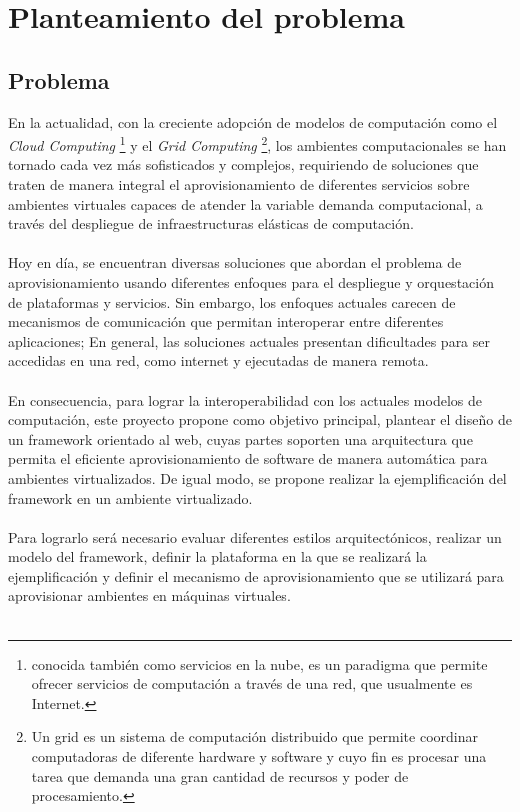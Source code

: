 \chapter{Planteamiento del problema}
\label{capproblema}

\section{Problema}
En la actualidad, con la creciente adopción de modelos de computación como el \emph{Cloud Computing} \footnote{conocida también como servicios en la nube, es un paradigma que permite ofrecer servicios de computación a través de una red, que usualmente es Internet.} y el \emph{Grid Computing} \footnote{Un grid es un sistema de computación distribuido que permite coordinar computadoras de diferente hardware y software y cuyo fin es procesar una tarea que demanda una gran cantidad de recursos y poder de procesamiento.}, los ambientes computacionales se han tornado cada vez más sofisticados y complejos, requiriendo de soluciones que traten de manera integral el aprovisionamiento de diferentes servicios sobre ambientes virtuales capaces de atender la variable demanda computacional, a través del despliegue de infraestructuras elásticas de computación.\\
\\
Hoy en día, se encuentran diversas soluciones que abordan el problema de aprovisionamiento usando diferentes enfoques para el despliegue y orquestación de plataformas y servicios. Sin embargo, los enfoques actuales carecen de mecanismos de comunicación que permitan interoperar entre diferentes aplicaciones; En general, las soluciones actuales presentan dificultades para ser accedidas en una red, como internet y ejecutadas de manera remota.\\
\\
En consecuencia, para lograr la interoperabilidad con los actuales modelos de computación, este proyecto propone como objetivo principal, plantear el diseño de un framework orientado al web, cuyas partes soporten una arquitectura que permita el eficiente aprovisionamiento de software de manera automática para ambientes virtualizados. De igual modo, se propone realizar la ejemplificación del framework en un ambiente virtualizado.\\
\\
Para lograrlo será necesario evaluar diferentes estilos arquitectónicos, realizar un modelo del framework, definir la plataforma en la que se realizará la ejemplificación y definir el mecanismo de aprovisionamiento que se utilizará para aprovisionar ambientes en máquinas virtuales.\\ 
\\

